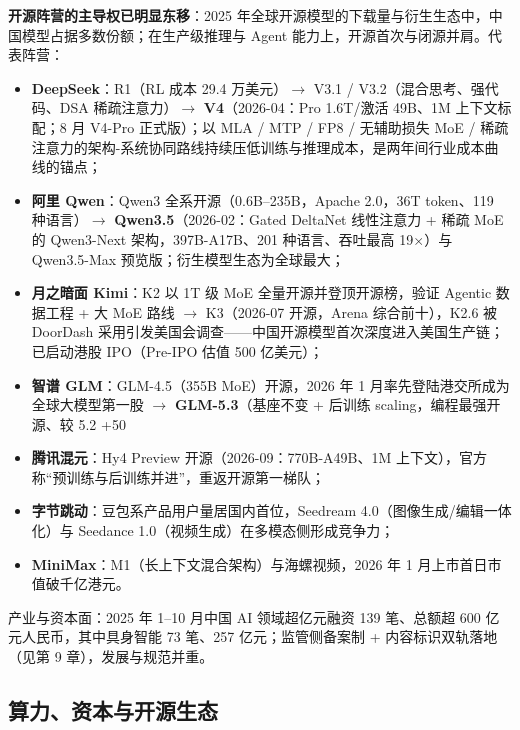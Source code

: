 \documentclass[12pt,a4paper]{article}
\begin{document}
\textbf{开源阵营的主导权已明显东移}：2025 年全球开源模型的下载量与衍生生态中，中国模型占据多数份额；在生产级推理与 Agent 能力上，开源首次与闭源并肩。代表阵营：
\begin{itemize}
  \item \textbf{DeepSeek}：R1（RL 成本 29.4 万美元）$\to$ V3.1 / V3.2（混合思考、强代码、DSA 稀疏注意力）$\to$ \textbf{V4}（2026-04：Pro 1.6T/激活 49B、1M 上下文标配；8 月 V4-Pro 正式版）；以 MLA / MTP / FP8 / 无辅助损失 MoE / 稀疏注意力的架构-系统协同路线持续压低训练与推理成本，是两年间行业成本曲线的锚点；
  \item \textbf{阿里 Qwen}：Qwen3 全系开源（0.6B--235B，Apache 2.0，36T token、119 种语言）$\to$ \textbf{Qwen3.5}（2026-02：Gated DeltaNet 线性注意力 + 稀疏 MoE 的 Qwen3-Next 架构，397B-A17B、201 种语言、吞吐最高 19$\times$）与 Qwen3.5-Max 预览版；衍生模型生态为全球最大；
  \item \textbf{月之暗面 Kimi}：K2 以 1T 级 MoE 全量开源并登顶开源榜，验证 Agentic 数据工程 + 大 MoE 路线 $\to$ K3（2026-07 开源，Arena 综合前十），K2.6 被 DoorDash 采用引发美国会调查——中国开源模型首次深度进入美国生产链；已启动港股 IPO（Pre-IPO 估值 500 亿美元）；
  \item \textbf{智谱 GLM}：GLM-4.5（355B MoE）开源，2026 年 1 月率先登陆港交所成为全球大模型第一股 $\to$ \textbf{GLM-5.3}（基座不变 + 后训练 scaling，编程最强开源、较 5.2 +50%
  \item \textbf{腾讯混元}：Hy4 Preview 开源（2026-09：770B-A49B、1M 上下文），官方称“预训练与后训练并进”，重返开源第一梯队；
  \item \textbf{字节跳动}：豆包系产品用户量居国内首位，Seedream 4.0（图像生成/编辑一体化）与 Seedance 1.0（视频生成）在多模态侧形成竞争力；
  \item \textbf{MiniMax}：M1（长上下文混合架构）与海螺视频，2026 年 1 月上市首日市值破千亿港元。
\end{itemize}
产业与资本面：2025 年 1--10 月中国 AI 领域超亿元融资 139 笔、总额超 600 亿元人民币，其中具身智能 73 笔、257 亿元；监管侧备案制 + 内容标识双轨落地（见第 9 章），发展与规范并重。

\subsection{算力、资本与开源生态}
\end{document}
